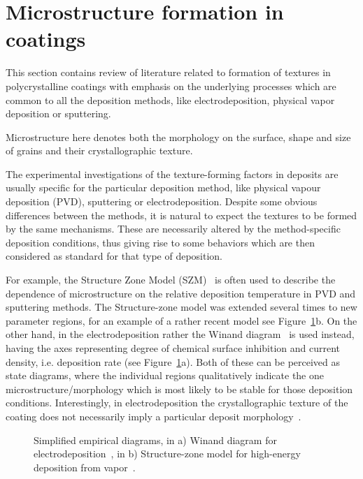 \section{Microstructure formation in coatings}
This section contains review of literature related to formation of textures in polycrystalline coatings with emphasis on the underlying processes which are common to all the deposition methods, like electrodeposition, physical vapor deposition or sputtering. 

Microstructure here denotes both the morphology on the surface, shape and size of grains and their crystallographic texture.

The experimental investigations of the texture-forming factors in deposits are usually specific for the particular deposition method, like physical vapour deposition (PVD), sputtering or electrodeposition. Despite some obvious differences between the methods, it is natural to expect the textures to be formed by the same mechanisms. These are necessarily altered by the method-specific deposition conditions, thus giving rise to some behaviors which are then considered as standard for that type of deposition. 

For example, the Structure Zone Model (SZM)~\cite{Barna1998, Anders2010} is often used to describe the dependence of microstructure on the relative deposition temperature in PVD and sputtering methods. The Structure-zone model was extended several times to new parameter regions, for an example of a rather recent model see Figure~\ref{fig_SZM_and_Winand}b. On the other hand, in the electrodeposition rather the Winand diagram~\cite{Winand1992} is used instead, having the axes representing degree of chemical surface inhibition and current density, i.e. deposition rate (see Figure~\ref{fig_SZM_and_Winand}a). Both of these can be perceived as state diagrams, where the individual regions qualitatively indicate the one microstructure/morphology which is most likely to be stable for those deposition conditions. Interestingly, in electrodeposition the crystallographic texture of the coating does not necessarily imply a particular deposit morphology~\cite{Winand1992}.

\begin{figure}
	\centering
	\caption[Examples of Structure Zone Model and Winand diagram]{Simplified empirical diagrams, in a) Winand diagram for electrodeposition~\cite{Winand1992}, in b) Structure-zone model for high-energy deposition from vapor~\cite{Anders2010}.}
	\label{fig_SZM_and_Winand}
\end{figure}

